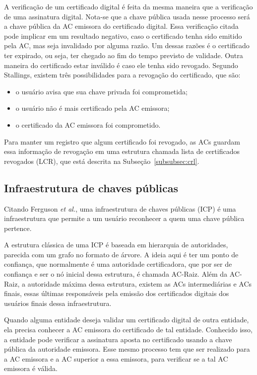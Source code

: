 \documentclass{article}
\begin{document}
A verificação de um certificado digital é feita da mesma maneira que
a verificação de uma assinatura digital. Nota-se que a chave pública usada
nesse processo será a chave pública da AC emissora do certificado digital. Essa
verificação citada pode implicar em um resultado negativo, caso o certificado
tenha sido emitido pela AC, mas seja invalidado por alguma razão. Um dessas
razões é o certificado ter expirado, ou seja, ter chegado ao fim do tempo
previsto de validade. Outra maneira do certificado estar inválido é caso ele
tenha sido revogado. Segundo Stallings, existem três possibilidades para
a revogação do certificado, que são:

\begin{itemize}
  \item o usuário avisa que sua chave privada foi comprometida;

  \item o usuário não é mais certificado pela AC emissora;

  \item o certificado da AC emissora foi comprometido.
\end{itemize}

Para manter um registro que algum certificado foi revogado, as ACs guardam essa
informação de revogação em uma estrutura chamada lista de certificados
revogados (LCR), que está descrita na Subseção~\ref{subsubsec:crl}.

\subsection{Infraestrutura de chaves públicas}\label{subsec:pki}

Citando Ferguson \textit{et al.}, uma infraestrutura de chaves públicas (ICP)
é uma infraestrutura que permite a um usuário reconhecer a quem uma chave
pública pertence.

A estrutura clássica de uma ICP é baseada em hierarquia de autoridades,
parecida com um grafo no formato de árvore. A ideia aqui é ter um ponto de
confiança, que normalmente é uma autoridade certificadora, que por ser de
confiança e ser o nó inicial dessa estrutura, é chamada AC-Raiz. Além da
AC-Raiz, a autoridade máxima dessa estrutura, existem as ACs intermediárias
e ACs finais, essas últimas responsáveis pela emissão dos certificados digitais
dos usuários finais dessa infraestrutura.

Quando alguma entidade deseja validar um certificado digital de outra entidade,
ela precisa conhecer a AC emissora do certificado de tal entidade. Conhecido
isso, a entidade pode verificar a assinatura aposta no certificado usando
a chave pública da autoridade emissora. Esse mesmo processo tem que ser
realizado para a AC emissora e a AC superior a essa emissora, para verificar se
a tal AC emissora é válida.
\end{document}
